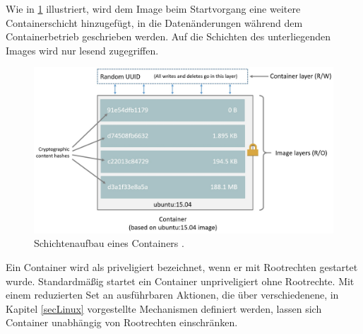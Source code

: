 \documentclass[../main.tex]{subfiles}
\begin{document}
			Wie in \fig \ref{fig:intro_dockerContainer} illustriert, wird dem Image beim Startvorgang eine weitere Containerschicht hinzugefügt, in die Datenänderungen während dem Containerbetrieb geschrieben werden. Auf die Schichten des unterliegenden Images wird nur lesend zugegriffen.

			\begin{figure}[!htbp]
          \centering
          \includegraphics[width=1.0\textwidth]{./images/intro_dockerContainer.jpg}
          \caption{Schichtenaufbau eines Containers \cite{dockerImagesAndContainers}.}
          \label{fig:intro_dockerContainer}
      \end{figure}

      Ein Container wird als priveligiert bezeichnet, wenn er mit Rootrechten gestartet wurde. Standardmäßig startet ein Container unpriveligiert ohne Rootrechte. Mit einem reduzierten Set an ausführbaren Aktionen, die über verschiedenene, in Kapitel \ref{secLinux} vorgestellte Mechanismen definiert werden, lassen sich Container unabhängig von Rootrechten einschränken.

\end{document}
